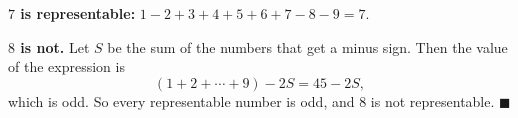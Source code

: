 \textbf{$7$ is representable:} $1-2+3+4+5+6+7-8-9=7$.

\textbf{$8$ is not.} Let $S$ be the sum of the numbers that get a minus sign. Then the value of the expression is
\[
(1+2+\cdots+9)-2S=45-2S,
\]
which is odd. So every representable number is odd, and $8$ is not representable. $\blacksquare$
